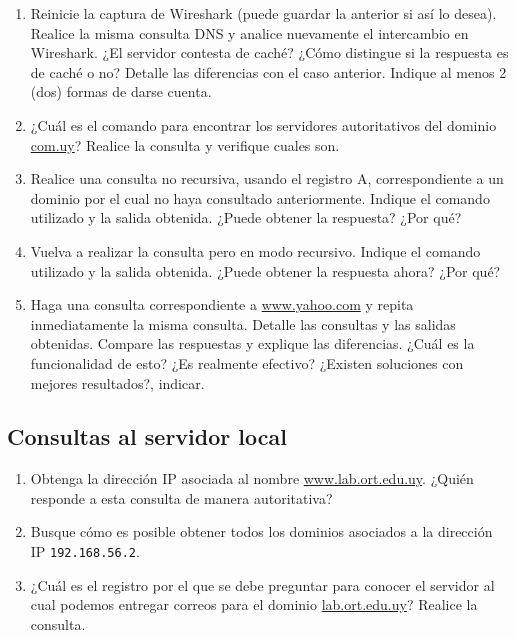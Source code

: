 \documentclass[a4paper,10pt]{article}
\begin{document}
\begin{enumerate}
    \item Reinicie la captura de Wireshark (puede guardar la anterior si así lo desea). Realice la misma consulta DNS y analice nuevamente el intercambio en Wireshark. ¿El servidor contesta de caché? ¿Cómo distingue si la respuesta es de caché o no? Detalle las diferencias con el caso anterior. Indique al menos 2 (dos) formas de darse cuenta.
    
    \item ¿Cuál es el comando para encontrar los servidores autoritativos del dominio \url{com.uy}? Realice la consulta y verifique cuales son.
    
    \item Realice una consulta no recursiva, usando el registro A, correspondiente a un dominio por el cual no haya consultado anteriormente. Indique el comando utilizado y la salida obtenida. ¿Puede obtener la respuesta? ¿Por qué? 
    \item Vuelva a realizar la consulta pero en modo recursivo. Indique el comando utilizado y la salida obtenida. ¿Puede obtener la respuesta ahora? ¿Por qué? 
    \item Haga una consulta correspondiente a \url{www.yahoo.com} y repita inmediatamente la misma consulta. Detalle las consultas y las salidas obtenidas. Compare las respuestas y explique las diferencias. ¿Cuál es la funcionalidad de esto? ¿Es realmente efectivo? ¿Existen soluciones con mejores resultados?, indicar.
    \end{enumerate}

\subsection*{Consultas al servidor local}

    \begin{enumerate}
    \item Obtenga la dirección IP asociada al nombre \url{www.lab.ort.edu.uy}. ¿Quién responde a esta consulta de manera autoritativa?
    
    \item Busque cómo es posible obtener todos los dominios asociados a la dirección IP \texttt{192.168.56.2}.
    
    \item ¿Cuál es el  registro por el que se debe preguntar para conocer el servidor al cual podemos entregar correos para el dominio \url{lab.ort.edu.uy}? Realice la consulta.
    
\end{enumerate}


\end{document}
